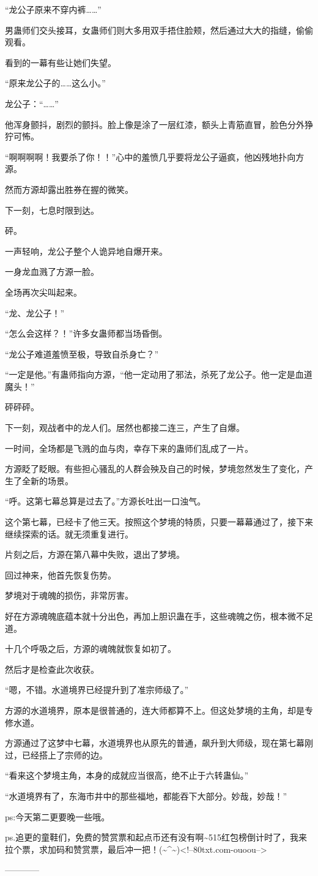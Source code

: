 \begin{this_body}
“龙公子原来不穿内裤……”

男蛊师们交头接耳，女蛊师们则大多用双手捂住脸颊，然后通过大大的指缝，偷偷观看。

看到的一幕有些让她们失望。

“原来龙公子的……这么小。”

龙公子：“……”

他浑身颤抖，剧烈的颤抖。脸上像是涂了一层红漆，额头上青筋直冒，脸色分外狰狞可怖。

“啊啊啊啊！我要杀了你！！”心中的羞愤几乎要将龙公子逼疯，他凶残地扑向方源。

然而方源却露出胜券在握的微笑。

下一刻，七息时限到达。

砰。

一声轻响，龙公子整个人诡异地自爆开来。

一身龙血溅了方源一脸。

全场再次尖叫起来。

“龙、龙公子！”

“怎么会这样？！”许多女蛊师都当场昏倒。

“龙公子难道羞愤至极，导致自杀身亡？”

“一定是他。”有蛊师指向方源，“他一定动用了邪法，杀死了龙公子。他一定是血道魔头！”

砰砰砰。

下一刻，观战者中的龙人们。居然也都接二连三，产生了自爆。

一时间，全场都是飞溅的血与肉，幸存下来的蛊师们乱成了一片。

方源眨了眨眼。有些担心骚乱的人群会殃及自己的时候，梦境忽然发生了变化，产生了全新的场景。

“呼。这第七幕总算是过去了。”方源长吐出一口浊气。

这个第七幕，已经卡了他三天。按照这个梦境的特质，只要一幕幕通过了，接下来继续探索的话。就无须重复进行。

片刻之后，方源在第八幕中失败，退出了梦境。

回过神来，他首先恢复伤势。

梦境对于魂魄的损伤，非常厉害。

好在方源魂魄底蕴本就十分出色，再加上胆识蛊在手，这些魂魄之伤，根本微不足道。

十几个呼吸之后，方源的魂魄就恢复如初了。

然后才是检查此次收获。

“嗯，不错。水道境界已经提升到了准宗师级了。”

方源的水道境界，原本是很普通的，连大师都算不上。但这处梦境的主角，却是专修水道。

方源通过了这梦中七幕，水道境界也从原先的普通，飙升到大师级，现在第七幕刚过，已经搭上了宗师的边。

“看来这个梦境主角，本身的成就应当很高，绝不止于六转蛊仙。”

“水道境界有了，东海市井中的那些福地，都能吞下大部分。妙哉，妙哉！”

ps:今天第二更要晚一些哦。

ps.追更的童鞋们，免费的赞赏票和起点币还有没有啊\~{}515红包榜倒计时了，我来拉个票，求加码和赞赏票，最后冲一把！(\~{}\^{}\~{})<!--80txt.com-ouoou-->

------------

\end{this_body}

